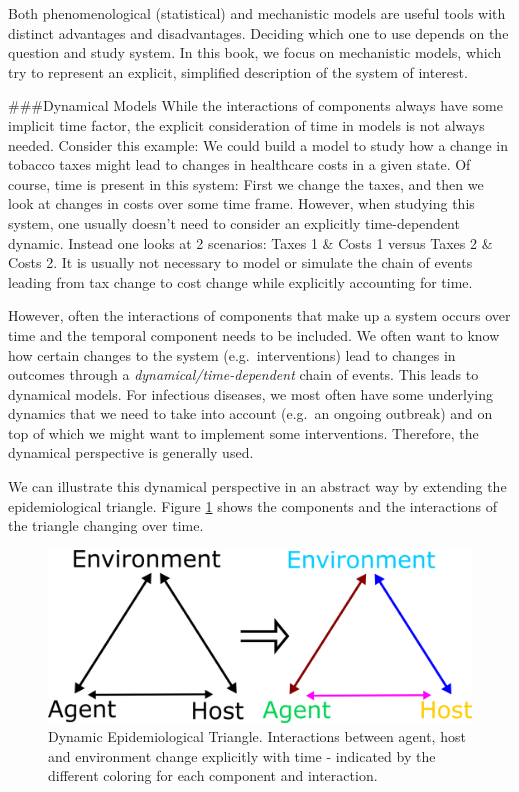 \documentclass[]{book}
\theoremstyle{definition}
\theoremstyle{definition}
\theoremstyle{definition}
\theoremstyle{remark}
\begin{document}
Both phenomenological (statistical) and mechanistic models are useful
tools with distinct advantages and disadvantages. Deciding which one to
use depends on the question and study system. In this book, we focus on
mechanistic models, which try to represent an explicit, simplified
description of the system of interest.

\#\#\#Dynamical Models While the interactions of components always have
some implicit time factor, the explicit consideration of time in models
is not always needed. Consider this example: We could build a model to
study how a change in tobacco taxes might lead to changes in healthcare
costs in a given state. Of course, time is present in this system: First
we change the taxes, and then we look at changes in costs over some time
frame. However, when studying this system, one usually doesn't need to
consider an explicitly time-dependent dynamic. Instead one looks at 2
scenarios: Taxes 1 \& Costs 1 versus Taxes 2 \& Costs 2. It is usually
not necessary to model or simulate the chain of events leading from tax
change to cost change while explicitly accounting for time.

However, often the interactions of components that make up a system
occurs over time and the temporal component needs to be included. We
often want to know how certain changes to the system
(e.g.~interventions) lead to changes in outcomes through a
\emph{dynamical/time-dependent} chain of events. This leads to dynamical
models. For infectious diseases, we most often have some underlying
dynamics that we need to take into account (e.g.~an ongoing outbreak)
and on top of which we might want to implement some interventions.
Therefore, the dynamical perspective is generally used.

We can illustrate this dynamical perspective in an abstract way by
extending the epidemiological triangle. Figure \ref{fig:dynamictriangle}
shows the components and the interactions of the triangle changing over
time.

\begin{figure}
\centering
\includegraphics{./images/moving-triangle.png}
\caption{\label{fig:dynamictriangle}Dynamic Epidemiological Triangle.
Interactions between agent, host and environment change explicitly with
time - indicated by the different coloring for each component and
interaction.}
\end{figure}
\end{document}
